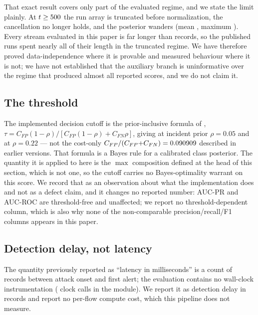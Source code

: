 \documentclass[manuscript,screen,nonacm]{acmart}
\begin{document}
That exact result covers only part of the evaluated regime, and we state the
limit plainly. At $t\ge500$ the run array is truncated before
normalization, the cancellation no longer holds, and the posterior wanders
(mean \SThreePrZeroTruncatedMean, maximum \SThreePrZeroTruncatedMax). Every
stream evaluated in this paper is far longer than \SThreeRunLengthCap{}
records, so the published runs spent nearly all of their length in the
truncated regime. We have therefore proved data-independence where it is
provable and measured behaviour where it is not; we have not established that
the auxiliary branch is uninformative over the regime that produced almost all
reported scores, and we do not claim it.

\subsection{The threshold}
The implemented decision cutoff is the prior-inclusive formula of
\citet{elkan2001cost},
$\tau = C_{FP}(1-\rho)/[C_{FP}(1-\rho) + C_{FN}\rho]$, giving
\SThreeThresholdLitnet{} at incident prior $\rho{=}0.05$ and
\SThreeThresholdCicids{} at $\rho{=}0.22$ --- not the cost-only
$C_{FP}/(C_{FP}{+}C_{FN}) = 0.090909$ described in earlier
versions. That formula is a Bayes rule for a calibrated class posterior. The
quantity it is applied to here is the $\max$ composition defined at the head of
this section, which is not one, so the cutoff carries no Bayes-optimality
warrant on this score. We record that as an observation about what the
implementation does and not as a defect claim, and it changes no reported
number: AUC-PR and AUC-ROC are threshold-free and unaffected; we report no
threshold-dependent column, which is also why none of the non-comparable
precision/recall/F1 columns appears in this paper.

\subsection{Detection delay, not latency}
The quantity previously reported as ``latency in milliseconds'' is a count of
records between attack onset and first alert; the evaluation contains no
wall-clock instrumentation (\SThreeLatencyUsesAClock{} clock calls in the
module). We report it as detection delay in records and report no per-flow
compute cost, which this pipeline does not measure.
\end{document}
